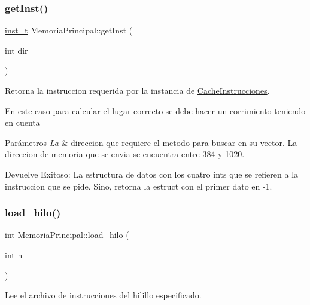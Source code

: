 \subsubsection{\texorpdfstring{get\+Inst()}{getInst()}}
{\footnotesize\ttfamily \hyperlink{structinst__t}{inst\+\_\+t} Memoria\+Principal\+::get\+Inst (\begin{DoxyParamCaption}\item[{int}]{dir }\end{DoxyParamCaption})}



Retorna la instruccion requerida por la instancia de \hyperlink{classCacheInstrucciones}{Cache\+Instrucciones}. 

En este caso para calcular el lugar correcto se debe hacer un corrimiento teniendo en cuenta 
\begin{DoxyParams}{Parámetros}
{\em La} & direccion que requiere el metodo para buscar en su vector. La direccion de memoria que se envia se encuentra entre 384 y 1020. \\
\hline
\end{DoxyParams}
\begin{DoxyReturn}{Devuelve}
Exitoso\+: La estructura de datos con los cuatro ints que se refieren a la instruccion que se pide. Sino, retorna la estruct con el primer dato en -\/1. 
\end{DoxyReturn}
\mbox{\label{classMemoriaPrincipal_a5262cc20950dd1b8fafd3d0dae36237f}} 
\subsubsection{\texorpdfstring{load\+\_\+hilo()}{load\_hilo()}}
{\footnotesize\ttfamily int Memoria\+Principal\+::load\+\_\+hilo (\begin{DoxyParamCaption}\item[{int}]{n }\end{DoxyParamCaption})}



Lee el archivo de instrucciones del hilillo especificado. 

